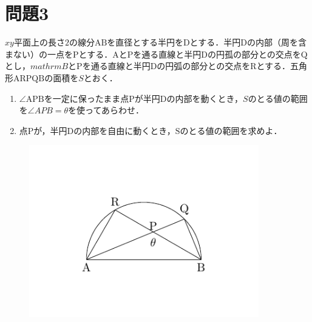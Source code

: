 \documentclass[unicode,12pt, A4j]{ltjsarticle}%
\begin{document}
\section{問題3}
$xy$平面上の長さ$2$の線分$\mathrm{AB}$を直径とする半円を$\mathrm{D}$とする．半円$\mathrm{D}$の内部（周を含まない）の一点を$\mathrm{P}$とする．$\mathrm{A}$と$\mathrm{P}$を通る直線と半円$\mathrm{D}$の円孤の部分との交点を$\mathrm{Q}$とし，$mathrm{B}$と$\mathrm{P}$を通る直線と半円$\mathrm{D}$の円弧の部分との交点を$\mathrm{R}$とする．五角形$\mathrm{ARPQB}$の面積を$S$とおく．
\begin{enumerate}
 \item $\angle \mathrm{APB}$を一定に保ったまま点$\mathrm{P}$が半円$\mathrm{D}$の内部を動くとき，$S$のとる値の範囲を$\angle APB=\theta$を使ってあらわせ．
 \item 点$\mathrm{P}$が，半円$\mathrm{D}$の内部を自由に動くとき，$\mathrm{S}$のとる値の範囲を求めよ．
\end{enumerate}
\begin{figure}[h]
\centering
 \includegraphics[width=10cm,bb=45 38 149 101]{fig1.pdf}
\end{figure}
\end{document}
